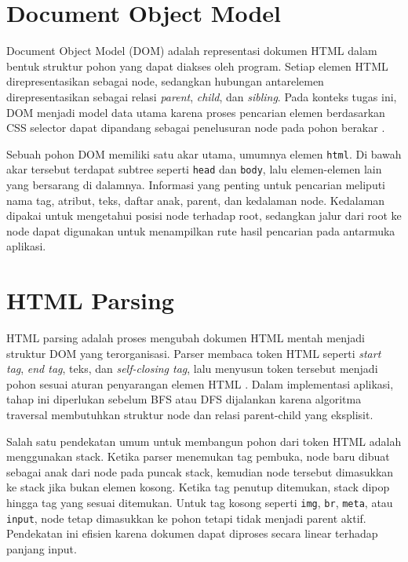 \section{Document Object Model}

Document Object Model (DOM) adalah representasi dokumen HTML dalam bentuk struktur pohon yang dapat diakses oleh program. Setiap elemen HTML direpresentasikan sebagai node, sedangkan hubungan antarelemen direpresentasikan sebagai relasi \textit{parent}, \textit{child}, dan \textit{sibling}. Pada konteks tugas ini, DOM menjadi model data utama karena proses pencarian elemen berdasarkan CSS selector dapat dipandang sebagai penelusuran node pada pohon berakar \cite{whatwgdom}.

Sebuah pohon DOM memiliki satu akar utama, umumnya elemen \texttt{html}. Di bawah akar tersebut terdapat subtree seperti \texttt{head} dan \texttt{body}, lalu elemen-elemen lain yang bersarang di dalamnya. Informasi yang penting untuk pencarian meliputi nama tag, atribut, teks, daftar anak, parent, dan kedalaman node. Kedalaman dipakai untuk mengetahui posisi node terhadap root, sedangkan jalur dari root ke node dapat digunakan untuk menampilkan rute hasil pencarian pada antarmuka aplikasi.

\section{HTML Parsing}

HTML parsing adalah proses mengubah dokumen HTML mentah menjadi struktur DOM yang terorganisasi. Parser membaca token HTML seperti \textit{start tag}, \textit{end tag}, teks, dan \textit{self-closing tag}, lalu menyusun token tersebut menjadi pohon sesuai aturan penyarangan elemen HTML \cite{whatwghtml}. Dalam implementasi aplikasi, tahap ini diperlukan sebelum BFS atau DFS dijalankan karena algoritma traversal membutuhkan struktur node dan relasi parent-child yang eksplisit.

Salah satu pendekatan umum untuk membangun pohon dari token HTML adalah menggunakan stack. Ketika parser menemukan tag pembuka, node baru dibuat sebagai anak dari node pada puncak stack, kemudian node tersebut dimasukkan ke stack jika bukan elemen kosong. Ketika tag penutup ditemukan, stack dipop hingga tag yang sesuai ditemukan. Untuk tag kosong seperti \texttt{img}, \texttt{br}, \texttt{meta}, atau \texttt{input}, node tetap dimasukkan ke pohon tetapi tidak menjadi parent aktif. Pendekatan ini efisien karena dokumen dapat diproses secara linear terhadap panjang input.


